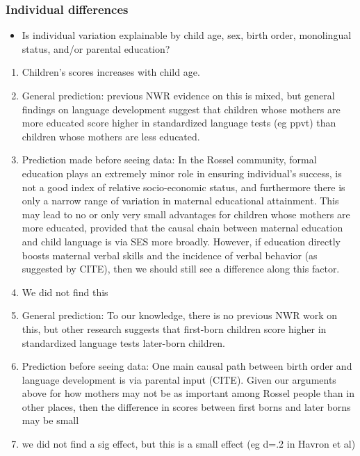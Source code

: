 \documentclass[english,,man,floatsintext]{apa6}
\providecommand{\tightlist}{%
  \setlength{\itemsep}{0pt}\setlength{\parskip}{0pt}}
\begin{document}
\subsubsection{Individual differences}\label{individual-differences}

\begin{itemize}
\tightlist
\item
  Is individual variation explainable by child age, sex, birth order,
  monolingual status, and/or parental education?
\end{itemize}

\begin{enumerate}
\def\labelenumi{\arabic{enumi}.}
\setcounter{enumi}{2}
\item
  Children's scores increases with child age.
\item
  General prediction: previous NWR evidence on this is mixed, but
  general findings on language development suggest that children whose
  mothers are more educated score higher in standardized language tests
  (eg ppvt) than children whose mothers are less educated.
\item
  Prediction made before seeing data: In the Rossel community, formal
  education plays an extremely minor role in ensuring individual's
  success, is not a good index of relative socio-economic status, and
  furthermore there is only a narrow range of variation in maternal
  educational attainment. This may lead to no or only very small
  advantages for children whose mothers are more educated, provided that
  the causal chain between maternal education and child language is via
  SES more broadly. However, if education directly boosts maternal
  verbal skills and the incidence of verbal behavior (as suggested by
  CITE), then we should still see a difference along this factor.
\item
  We did not find this
\item
  General prediction: To our knowledge, there is no previous NWR work on
  this, but other research suggests that first-born children score
  higher in standardized language tests later-born children.
\item
  Prediction before seeing data: One main causal path between birth
  order and language development is via parental input (CITE). Given our
  arguments above for how mothers may not be as important among Rossel
  people than in other places, then the difference in scores between
  first borns and later borns may be small
\item
  we did not find a sig effect, but this is a small effect (eg d=.2 in
  Havron et al)
\end{enumerate}
\end{document}
